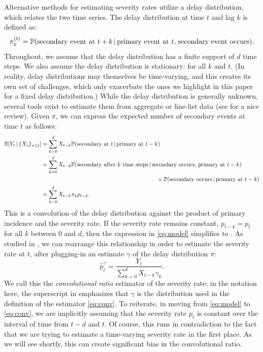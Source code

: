 \documentclass{article}
\renewcommand{\hat}{\widehat} %
\newcommand{\given}{\, \vert \,}
\begin{document}
Alternative methods for estimating severity rates utilize a delay distribution,
which relates the two time series. The delay distribution at time $t$ and lag
$k$ is defined as: 
\[
\pi_k^{(t)} = \P(\text{secondary event at $t+k$} \given \text{primary event at
  $t$, secondary event occurs}).  
\]
Throughout, we assume that the delay distribution has a finite support
of $d$ time steps. We also assume the delay distribution is stationary:
 for all $k$ and $t$. (In reality, delay
distributions may themselves be time-varying, and this creates its own set of
challenges, which only exacerbate the ones we highlight in this paper for a
fixed delay distribution.) While the delay distribution is generally unknown,
several tools exist to estimate them from aggregate or line-list data (see
\citealp{delay_distrs} for a nice review). Given $\pi$, we can express the
expected number of secondary events at time $t$ as follows: 
\begin{align}
\E[Y_t \given \{X_s\}_{s\leq t}]
&= \sum_{k=0}^d X_{t-k} \P(\text{secondary at $t$} \given \text{primary at
  $t-k$}) \nonumber \\   
&= \sum_{k=0}^d X_{t-k} \P(\text{secondary after $k$ time steps} \given
  \text{secondary occurs, primary at $t-k$}) \nonumber \\
&\hspace{200pt} \times\P(\text{secondary occurs} \given\text{primary at $t-k$})
  \nonumber \\  
\label{eq:model}
&= \sum_{k=0}^d X_{t-k} \pi_k p_{t-k}.
\end{align}
This is a convolution of the delay distribution against the product of primary
incidence and the severity rate. If the severity rate remains constant, $p_{t-k}
= p_t$ for all $k$ between $0$ and $d$, then the expression in \eqref{eq:model}
simplifies to \smash{$\E[Y_t \given \{X_s\}_{s\leq t}] = p_t \sum_{k=0}^d
  X_{t-k} \pi_k$}. As studied in \citet{UKpaper}, we can rearrange this
relationship in order to estimate the severity rate at $t$, after plugging-in an
estimate $\gamma$ of the delay distribution $\pi$:   
\begin{equation}
\label{eq:conv}
\hat{p}_t^\gamma = \frac{Y_t}{\sum_{k=0}^d X_{t-k} \gamma_k}.
\end{equation}
We call this the \emph{convolutional ratio} estimator of the severity rate; in
the notation here, the superscript in \smash{$\hat{p}_t^\gamma$} emphasizes that
$\gamma$ is the distribution used in the definition of the estimator
\eqref{eq:conv}. To reiterate, in moving from \eqref{eq:model} to
\eqref{eq:conv}, we are implicitly assuming that the severity rate $p_t$ is
constant over the interval of time from $t-d$ and $t$. Of course, this runs in
contradiction to the fact that we are trying to estimate a time-varying severity
rate in the first place. As we will see shortly, this can create significant
bias in the convolutional ratio.  
\end{document}
